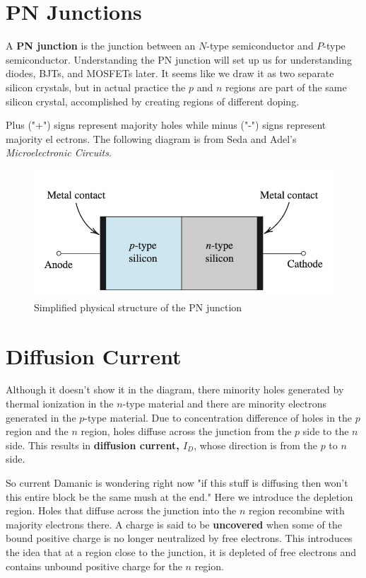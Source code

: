 \section{PN Junctions}

A \textbf{PN junction} is the junction between an $N$-type semiconductor and $P$-type semiconductor. Understanding the PN junction will set up us for understanding diodes, BJTs, and MOSFETs later. It seems like we draw it as two separate silicon crystals, but in actual practice the $p$ and $n$ regions are part of the same silicon crystal, accomplished by creating regions of different doping.

Plus ("+") signs represent majority holes while minus ("-") signs represent majority el ectrons. The following diagram is from Seda and Adel's \textit{Microelectronic Circuits}.

\begin{figure}[H]
    \centering
    \includegraphics{figs/ch03/pn_junction.png}
    \caption{Simplified physical structure of the PN junction}
\end{figure}

\section{Diffusion Current}
Although it doesn't show it in the diagram, there minority holes generated by thermal ionization in the $n$-type material and there are minority electrons generated in the $p$-type material. Due to concentration difference of holes in the $p$ region and the $n$ region, holes diffuse across the junction from the $p$ side to the $n$ side. This results in \textbf{diffusion current, $I_D$}, whose direction is from the $p$ to $n$ side.

So current Damanic is wondering right now "if this stuff is diffusing then won't this entire block be the same mush at the end." Here we introduce the depletion region. Holes that diffuse across the junction into the $n$ region recombine with majority electrons there. A charge is said to be \textbf{uncovered} when some of the bound positive charge is no longer neutralized by free electrons. This introduces the idea that at a region close to the junction, it is depleted of free electrons and contains unbound positive charge for the $n$ region.

